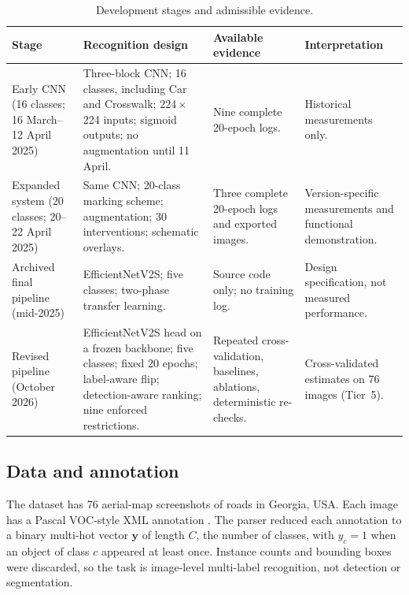 \documentclass[11pt]{article}
\begin{document}
\begin{table}[htbp]
\centering\small
\caption{Development stages and admissible evidence.}
\label{tab:stages}
\begin{tabularx}{\textwidth}{P{0.19\textwidth} P{0.30\textwidth} P{0.25\textwidth} Y}
\toprule
Stage & Recognition design & Available evidence & Interpretation \\
\midrule
Early CNN (16 classes; 16 March--12 April 2025) & Three-block CNN; 16 classes, including Car and Crosswalk; 224\,$\times$\,224 inputs; sigmoid outputs; no augmentation until 11 April. & Nine complete 20-epoch logs. & Historical measurements only. \\
Expanded system (20 classes; 20--22 April 2025) & Same CNN; 20-class marking scheme; augmentation; 30 interventions; schematic overlays. & Three complete 20-epoch logs and exported images. & Version-specific measurements and functional demonstration. \\
Archived final pipeline (mid-2025) & EfficientNetV2S; five classes; two-phase transfer learning. & Source code only; no training log. & Design specification, not measured performance. \\
Revised pipeline (October 2026) & EfficientNetV2S head on a frozen backbone; five classes; fixed 20 epochs; label-aware flip; detection-aware ranking; nine enforced restrictions. & Repeated cross-validation, baselines, ablations, deterministic re-checks. & Cross-validated estimates on 76 images (Tier~5). \\
\bottomrule
\end{tabularx}
\end{table}

\subsection{Data and annotation}
\label{sec:data}
The dataset has 76 aerial-map screenshots of roads in Georgia, USA. Each image has a Pascal VOC-style XML annotation \citep{everingham2010}. The parser reduced each annotation to a binary multi-hot vector $\mathbf{y}$ of length $C$, the number of classes, with $y_c=1$ when an object of class $c$ appeared at least once. Instance counts and bounding boxes were discarded, so the task is image-level multi-label recognition, not detection or segmentation.
\end{document}
